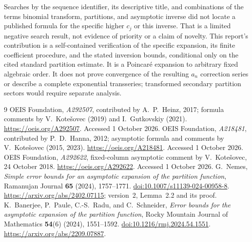 \documentclass[11pt]{article}
\theoremstyle{remark}\newtheorem{remark}[theorem]{Remark}
\begin{document}
Searches by the sequence identifier, its descriptive title, and combinations of the terms binomial transform, partitions, and asymptotic inverse did not locate a published formula for the specific higher $c_j$ or this inverse. That is a limited negative search result, not evidence of priority or a claim of novelty. This report's contribution is a self-contained verification of the specific expansion, its finite coefficient procedure, and the stated inversion bounds, conditional only on the cited standard partition estimate. It is a Poincar\'e expansion to arbitrary fixed algebraic order. It does not prove convergence of the resulting $a_n$ correction series or describe a complete exponential transseries; transformed secondary partition sectors would require separate analysis.

\clearpage
\begin{thebibliography}{9}
OEIS Foundation, \emph{A292507}, contributed by A.~P.~Heinz, 2017;
formula comments by V.~Kote\v{s}ovec (2019) and I.~Gutkovskiy (2021).
\url{https://oeis.org/A292507}. Accessed 1 October 2026.
OEIS Foundation, \emph{A218481}, contributed by P.~D.~Hanna, 2012;
asymptotic formula and comments by V.~Kote\v{s}ovec (2015, 2023).
\url{https://oeis.org/A218481}. Accessed 1 October 2026.
OEIS Foundation, \emph{A292622}, fixed-column asymptotic comment by
V.~Kote\v{s}ovec, 24 October 2018.
\url{https://oeis.org/A292622}. Accessed 1 October 2026.
G.~Nemes, \emph{Simple error bounds for an asymptotic expansion of the partition function},
Ramanujan Journal \textbf{65} (2024), 1757--1771.
\href{https://doi.org/10.1007/s11139-024-00958-8}{doi:10.1007/s11139-024-00958-8}.
\url{https://arxiv.org/abs/2402.07115}; version~2, Lemma~2.2 and its proof.
K.~Banerjee, P.~Paule, C.-S.~Radu, and C.~Schneider,
\emph{Error bounds for the asymptotic expansion of the partition function},
Rocky Mountain Journal of Mathematics \textbf{54}(6) (2024), 1551--1592.
\href{https://doi.org/10.1216/rmj.2024.54.1551}{doi:10.1216/rmj.2024.54.1551}.
\url{https://arxiv.org/abs/2209.07887}.
\end{thebibliography}
\end{document}
